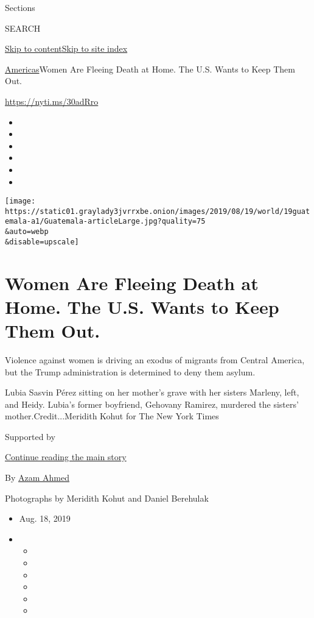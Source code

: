 Sections

SEARCH

\protect\hyperlink{site-content}{Skip to
content}\protect\hyperlink{site-index}{Skip to site index}

\href{/section/world/americas}{Americas}\textbar{}Women Are Fleeing
Death at Home. The U.S. Wants to Keep Them Out.

\url{https://nyti.ms/30adRro}

\begin{itemize}
\item
\item
\item
\item
\item
\item
\end{itemize}

\texttt{[image: https://static01.graylady3jvrrxbe.onion/images/2019/08/19/world/19guatemala-a1/Guatemala-articleLarge.jpg?quality=75\\\&auto=webp\\\&disable=upscale]}

\hypertarget{women-are-fleeing-death-at-home-the-us-wants-to-keep-them-out}{%
\section{Women Are Fleeing Death at Home. The U.S. Wants to Keep Them
Out.}\label{women-are-fleeing-death-at-home-the-us-wants-to-keep-them-out}}

Violence against women is driving an exodus of migrants from Central
America, but the Trump administration is determined to deny them asylum.

Lubia Sasvin Pérez sitting on her mother's grave with her sisters
Marleny, left, and Heidy. Lubia's former boyfriend, Gehovany Ramirez,
murdered the sisters' mother.Credit...Meridith Kohut for The New York
Times

Supported by

\protect\hyperlink{after-sponsor}{Continue reading the main story}

By \href{https://www.nytimes3xbfgragh.onion/by/azam-ahmed}{Azam Ahmed}

Photographs by Meridith Kohut and Daniel Berehulak

\begin{itemize}
\item
  Aug. 18, 2019
\item
  \begin{itemize}
  \item
  \item
  \item
  \item
  \item
  \item
  \end{itemize}
\end{itemize}

